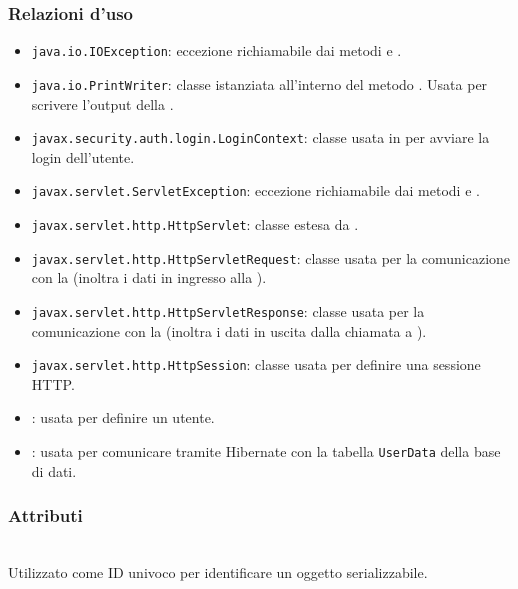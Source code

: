 \subsubsection*{Relazioni d'uso}
\begin{itemize}
	\item \texttt{java.io.IOException}: eccezione richiamabile dai metodi  e .
	\item \texttt{java.io.PrintWriter}: classe istanziata all'interno del metodo . Usata per scrivere l'output della .
	\item \texttt{javax.security.auth.login.LoginContext}: classe usata in  per avviare la login dell'utente.
	\item \texttt{javax.servlet.ServletException}: eccezione richiamabile dai metodi  e .
	\item \texttt{javax.servlet.http.HttpServlet}: classe estesa da .
	\item \texttt{javax.servlet.http.HttpServletRequest}:  classe usata per la comunicazione con la  (inoltra i dati in ingresso alla ).
	\item \texttt{javax.servlet.http.HttpServletResponse}: classe usata per la comunicazione con la  (inoltra i dati in uscita dalla chiamata a ).
	\item \texttt{javax.servlet.http.HttpSession}: classe usata per definire una sessione HTTP.
	\item {}: usata per definire un utente.
	\item {}: usata per comunicare tramite Hibernate con la tabella \texttt{UserData} della base di dati.
\end{itemize}

\subsubsection*{Attributi}
\begin{description}
  \item{}\\
  Utilizzato come ID univoco per identificare un oggetto serializzabile.
\end{description}

